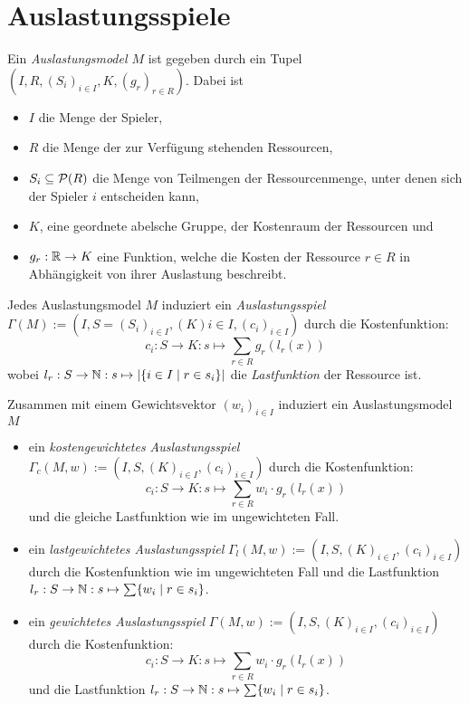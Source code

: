 \section{Auslastungsspiele}\label{sec:Auslastungsspiele}

\begin{defn}\label{def:Auslastungsmodel}
	Ein \emph{Auslastungsmodel $M$} ist gegeben durch ein Tupel $(I, R, (S_i)_{i\in I}, K, (g_r)_{r \in R})$. Dabei ist
	\begin{itemize}
		\item $I$ die Menge der Spieler,
		\item $R$ die Menge der zur Verfügung stehenden Ressourcen,
		\item $S_i \subseteq \mathcal{P}(R)$ die Menge von Teilmengen der Ressourcenmenge, unter denen sich der Spieler $i$ entscheiden kann,
		\item $K$, eine geordnete abelsche Gruppe, der Kostenraum der Ressourcen und
		\item $g_r: \mathbb{R} \to K$ eine Funktion, welche die Kosten der Ressource $r \in R$ in Abhängigkeit von ihrer Auslastung beschreibt.
	\end{itemize}
\end{defn}

\begin{defn}\label{def:Auslastungsspiel}
	Jedes Auslastungsmodel $M$ induziert ein \emph{Auslastungsspiel} $\Gamma(M) := (I, S = (S_i)_{i\in I}, (K){i\in I}, (c_i)_{i \in I})$ durch die Kostenfunktion:
		\[c_i: S \to K: s \mapsto \sum_{r \in R} g_r(l_r(x)) \]
	wobei $l_r: S \to \mathbb{N}: s \mapsto \left|\{i\in I \mid r \in s_i\}\right|$ die \emph{Lastfunktion} der Ressource ist.
\end{defn}

\begin{defn}\label{def:gewAuslastungsspiel}
	Zusammen mit einem Gewichtsvektor $(w_i)_{i\in I}$ induziert ein Auslastungsmodel $M$ 
	\begin{itemize}
		\item ein \emph{kostengewichtetes Auslastungsspiel} $\Gamma_c(M, w) := (I, S, (K)_{i\in I}, (c_i)_{i \in I})$ durch die Kostenfunktion:
		\[c_i: S \to K: s \mapsto \sum_{r \in R} w_i\cdot g_r(l_r(x)) \]
		und die gleiche Lastfunktion wie im ungewichteten Fall.
		\item ein \emph{lastgewichtetes Auslastungsspiel} $\Gamma_l(M, w) := (I, S, (K)_{i\in I}, (c_i)_{i \in I})$ durch die Kostenfunktion wie im ungewichteten Fall und die Lastfunktion $l_r: S \to \mathbb{N}: s \mapsto \sum\{w_i \mid r \in s_i\}$.
		\item ein \emph{gewichtetes Auslastungsspiel} $\Gamma(M, w) := (I, S, (K)_{i\in I}, (c_i)_{i \in I})$ durch die Kostenfunktion:
		\[c_i: S \to K: s \mapsto \sum_{r \in R} w_i\cdot g_r(l_r(x)) \]
		und die Lastfunktion $l_r: S \to \mathbb{N}: s \mapsto \sum\{w_i \mid r \in s_i\}$.
	\end{itemize}	
\end{defn}

